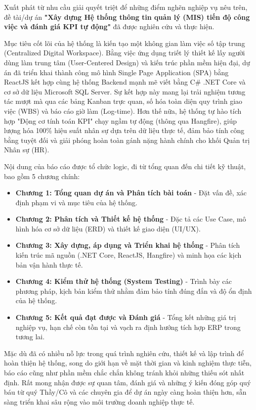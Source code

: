\documentclass[a4paper,13.5pt]{extreport}
\begin{document}
Xuất phát từ nhu cầu giải quyết triệt để những điểm nghẽn nghiệp vụ nêu trên, đề tài/dự án \textbf{"Xây dựng Hệ thống thông tin quản lý (MIS) tiến độ công việc và đánh giá KPI tự động"} đã được nghiên cứu và thực hiện. 

Mục tiêu cốt lõi của hệ thống là kiến tạo một không gian làm việc số tập trung (Centralized Digital Workspace). Bằng việc ứng dụng triết lý thiết kế lấy người dùng làm trung tâm (User-Centered Design) và kiến trúc phần mềm hiện đại, dự án đã triển khai thành công mô hình Single Page Application (SPA) bằng ReactJS kết hợp cùng hệ thống Backend mạnh mẽ viết bằng C\# .NET Core và cơ sở dữ liệu Microsoft SQL Server. Sự kết hợp này mang lại trải nghiệm tương tác mượt mà qua các bảng Kanban trực quan, số hóa toàn diện quy trình giao việc (WBS) và báo cáo giờ làm (Log-time). Hơn thế nữa, hệ thống tự hào tích hợp "Động cơ tính toán KPI" chạy ngầm tự động (thông qua Hangfire), giúp lượng hóa 100\% hiệu suất nhân sự dựa trên dữ liệu thực tế, đảm bảo tính công bằng tuyệt đối và giải phóng hoàn toàn gánh nặng hành chính cho khối Quản trị Nhân sự (HR).

Nội dung của báo cáo được tổ chức logic, đi từ tổng quan đến chi tiết kỹ thuật, bao gồm 5 chương chính:
\begin{itemize}
    \item \textbf{Chương 1: Tổng quan dự án và Phân tích bài toán} - Đặt vấn đề, xác định phạm vi và mục tiêu của hệ thống.
    \item \textbf{Chương 2: Phân tích và Thiết kế hệ thống} - Đặc tả các Use Case, mô hình hóa cơ sở dữ liệu (ERD) và thiết kế giao diện (UI/UX).
    \item \textbf{Chương 3: Xây dựng, áp dụng và Triển khai hệ thống} - Phân tích kiến trúc mã nguồn (.NET Core, ReactJS, Hangfire) và minh họa các kịch bản vận hành thực tế.
    \item \textbf{Chương 4: Kiểm thử hệ thống (System Testing)} - Trình bày các phương pháp, kịch bản kiểm thử nhằm đảm bảo tính đúng đắn và độ ổn định của hệ thống.
    \item \textbf{Chương 5: Kết quả đạt được và Đánh giá} - Tổng kết những giá trị nghiệp vụ, hạn chế còn tồn tại và vạch ra định hướng tích hợp ERP trong tương lai.
\end{itemize}

Mặc dù đã có nhiều nỗ lực trong quá trình nghiên cứu, thiết kế và lập trình để hoàn thiện hệ thống, song do giới hạn về mặt thời gian và kinh nghiệm thực tiễn, báo cáo cũng như phần mềm chắc chắn không tránh khỏi những thiếu sót nhất định. Rất mong nhận được sự quan tâm, đánh giá và những ý kiến đóng góp quý báu từ quý Thầy/Cô và các chuyên gia để dự án ngày càng hoàn thiện hơn, sẵn sàng triển khai sâu rộng vào môi trường doanh nghiệp thực tế.
\end{document}
